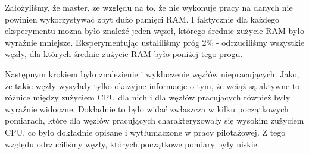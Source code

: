Założyliśmy, że master, ze względu na to, że nie wykonuje pracy na danych nie powinien wykorzystywać zbyt dużo pamięci RAM. I faktycznie dla każdego eksperymentu można było znaleźć jeden węzeł, którego średnie zużycie RAM było wyraźnie mniejsze. Eksperymentując ustaliliśmy próg 2\% - odrzuciliśmy wszystkie węzły, dla których średnie zużycie RAM było poniżej tego progu.

Następnym krokiem było znalezienie i wykluczenie węzłów niepracujących. Jako, że takie węzły wysyłały tylko okazyjne informacje o tym, że wciąż są aktywne to różnice między zużyciem CPU dla nich i dla węzłów pracujących również były wyraźnie widoczne. Dokładnie to było widać zwłaszcza w kilku początkowych pomiarach, które dla węzłów pracujących charakteryzowały się wysokim zużyciem CPU, co było dokładnie opisane i wytłumaczone w pracy pilotażowej. Z tego względu odrzuciliśmy węzły, których początkowe pomiary były niskie.

